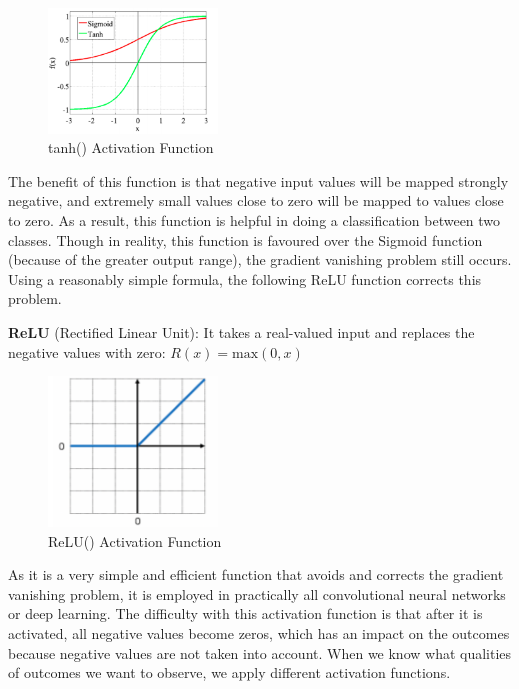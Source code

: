 \documentclass[a4paper,11pt,oneside]{book}
\begin{document}
\begin{figure}[!h]
	\centering
	\includegraphics[width=0.4\textwidth]{figures/tanh}
	\caption{tanh() Activation Function}
	\label{fourthfig}
\end{figure}

The benefit of this function is that negative input values will be mapped strongly negative, and extremely small values close to zero will be mapped to values close to zero. As a result, this function is helpful in doing a classification between two classes.
Though in reality, this function is favoured over the Sigmoid function (because of the greater output range), the gradient vanishing problem still occurs. Using a reasonably simple formula, the following ReLU function corrects this problem.\newline\newline

\textbf{ReLU} (Rectified Linear Unit): It takes a real-valued input and replaces the negative values with zero:
\newline\newline
$R(x)= \text{max}(0,x)$
\begin{figure}[!h]
	\centering
	\includegraphics[width=0.4\textwidth]{figures/Relu}
	\caption{ReLU() Activation Function}
	\label{fifthfig}
\end{figure}
\newline\newline As it is a very simple and efficient function that avoids and corrects the gradient vanishing problem, it is employed in practically all convolutional neural networks or deep learning.
The difficulty with this activation function is that after it is activated, all negative values become zeros, which has an impact on the outcomes because negative values are not taken into account.
\newline\newline When we know what qualities of outcomes we want to observe, we apply different activation functions.
\end{document}
